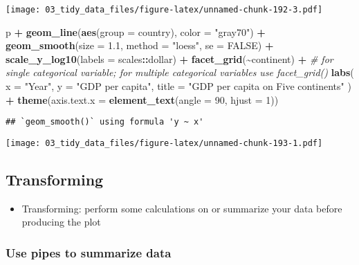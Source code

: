 \documentclass[
]{book}
\newenvironment{Shaded}{\begin{snugshade}}{\end{snugshade}}
\newcommand{\CommentTok}[1]{\textcolor[rgb]{0.56,0.35,0.01}{\textit{#1}}}
\newcommand{\DataTypeTok}[1]{\textcolor[rgb]{0.13,0.29,0.53}{#1}}
\newcommand{\DecValTok}[1]{\textcolor[rgb]{0.00,0.00,0.81}{#1}}
\newcommand{\FloatTok}[1]{\textcolor[rgb]{0.00,0.00,0.81}{#1}}
\newcommand{\KeywordTok}[1]{\textcolor[rgb]{0.13,0.29,0.53}{\textbf{#1}}}
\newcommand{\NormalTok}[1]{#1}
\newcommand{\OperatorTok}[1]{\textcolor[rgb]{0.81,0.36,0.00}{\textbf{#1}}}
\newcommand{\OtherTok}[1]{\textcolor[rgb]{0.56,0.35,0.01}{#1}}
\newcommand{\StringTok}[1]{\textcolor[rgb]{0.31,0.60,0.02}{#1}}
\providecommand{\tightlist}{%
  \setlength{\itemsep}{0pt}\setlength{\parskip}{0pt}}
\begin{document}
\texttt{[image: 03\_tidy\_data\_files/figure-latex/unnamed-chunk-192-3.pdf]}

\begin{Shaded}
\begin{Highlighting}[]
\NormalTok{p }\OperatorTok{+}\StringTok{ }\KeywordTok{geom\_line}\NormalTok{(}\KeywordTok{aes}\NormalTok{(}\DataTypeTok{group =}\NormalTok{ country), }\DataTypeTok{color =} \StringTok{"gray70"}\NormalTok{) }\OperatorTok{+}
\StringTok{  }\KeywordTok{geom\_smooth}\NormalTok{(}\DataTypeTok{size =} \FloatTok{1.1}\NormalTok{, }\DataTypeTok{method =} \StringTok{"loess"}\NormalTok{, }\DataTypeTok{se =} \OtherTok{FALSE}\NormalTok{) }\OperatorTok{+}
\StringTok{  }\KeywordTok{scale\_y\_log10}\NormalTok{(}\DataTypeTok{labels =}\NormalTok{ scales}\OperatorTok{::}\NormalTok{dollar) }\OperatorTok{+}
\StringTok{  }\KeywordTok{facet\_grid}\NormalTok{(}\OperatorTok{\textasciitilde{}}\NormalTok{continent) }\OperatorTok{+}\StringTok{ }\CommentTok{\# for single categorical variable; for multiple categorical variables use facet\_grid()}
\StringTok{  }\KeywordTok{labs}\NormalTok{(}
    \DataTypeTok{x =} \StringTok{"Year"}\NormalTok{,}
    \DataTypeTok{y =} \StringTok{"GDP per capita"}\NormalTok{,}
    \DataTypeTok{title =} \StringTok{"GDP per capita on Five continents"}
\NormalTok{  ) }\OperatorTok{+}
\StringTok{  }\KeywordTok{theme}\NormalTok{(}\DataTypeTok{axis.text.x =} \KeywordTok{element\_text}\NormalTok{(}\DataTypeTok{angle =} \DecValTok{90}\NormalTok{, }\DataTypeTok{hjust =} \DecValTok{1}\NormalTok{))}
\end{Highlighting}
\end{Shaded}

\begin{verbatim}
## `geom_smooth()` using formula 'y ~ x'
\end{verbatim}

\texttt{[image: 03\_tidy\_data\_files/figure-latex/unnamed-chunk-193-1.pdf]}

\hypertarget{transforming}{%
\subsection{Transforming}\label{transforming}}

\begin{itemize}
\tightlist
\item
  Transforming: perform some calculations on or summarize your data before producing the plot
\end{itemize}

\hypertarget{use-pipes-to-summarize-data}{%
\subsubsection{Use pipes to summarize data}\label{use-pipes-to-summarize-data}}
\end{document}
